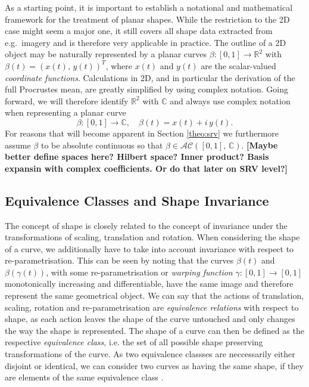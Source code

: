 As a starting point, it is important to establish a notational and mathematical framework for the treatment of planar shapes.
While the restriction to the 2D case might seem a major one, it still covers all shape data extracted from e.g.\ imagery and is therefore very applicable in practice.
The outline of a 2D object may be naturally represented by a planar curves $\beta : [0,1] \rightarrow \mathbb{R}^2$ with $\beta(t) = (x(t),\, y(t))^T$, where $x(t)$ and $y(t)$ are the scalar-valued \textit{coordinate functions}.
Calculations in 2D, and in particular the derivation of the full Procrustes mean, are greatly simplified by using complex notation.
Going forward, we will therefore identify $\mathbb{R}^2$ with $\mathbb{C}$ and always use complex notation when representing a planar curve
$$\beta : [0,1] \rightarrow \mathbb{C}, \quad \beta(t) = x(t) + i\, y(t).$$
For reasons that will become apparent in Section \ref{theo:srv} we furthermore assume $\beta$ to be absolute continuous so that $\beta \in \mathcal{AC}([0,1],\, \mathbb{C})$.
\textbf{[Maybe better define spaces here? Hilbert space? Inner product? Basis expansin with complex coefficients. Or do that later on SRV level?]}

\subsection{Equivalence Classes and Shape Invariance}
\label{theo:inv}
The concept of shape is closely related to the concept of invariance under the transformations of scaling, translation and rotation.
When considering the shape of a curve, we additionally have to take into account invariance with respect to re-parametrisation.
This can be seen by noting that the curves $\beta(t)$ and $\beta(\gamma(t))$, with some re-parametrisation or \textit{warping function} $\gamma : [0,1] \rightarrow [0,1]$ monotonically increasing and differentiable, have the same image and therefore represent the same geometrical object.
We can say that the actions of translation, scaling, rotation and re-parametrisation are \textit{equivalence relations} with respect to shape, as each action leaves the shape of the curve untouched and only changes the way the shape is represented.
The shape of a curve can then be defined as the respective \textit{equivalence class}, i.e. the set of all possible shape preserving transformations of the curve.
As two equivalence classses are neccessarily either disjoint or identical, we can consider two curves as having the same shape, if they are elements of the same equivalence class \parencite[see][40]{SrivastavaKlassen2016}.

